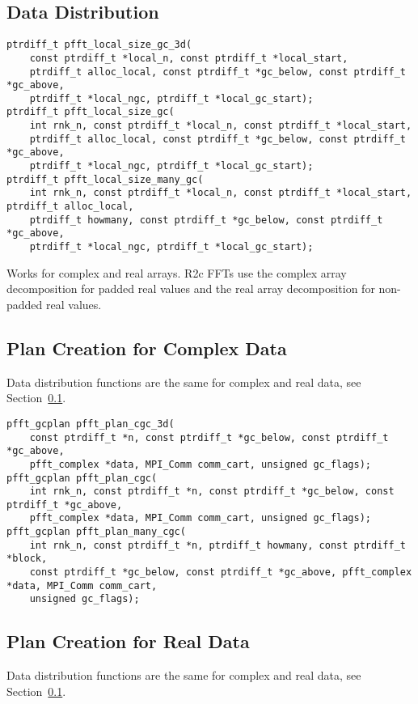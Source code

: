 \subsection{Data Distribution}\label{sec:gc:local_size}
\begin{lstlisting}
ptrdiff_t pfft_local_size_gc_3d(
    const ptrdiff_t *local_n, const ptrdiff_t *local_start,
    ptrdiff_t alloc_local, const ptrdiff_t *gc_below, const ptrdiff_t *gc_above,
    ptrdiff_t *local_ngc, ptrdiff_t *local_gc_start);
ptrdiff_t pfft_local_size_gc(
    int rnk_n, const ptrdiff_t *local_n, const ptrdiff_t *local_start,
    ptrdiff_t alloc_local, const ptrdiff_t *gc_below, const ptrdiff_t *gc_above,
    ptrdiff_t *local_ngc, ptrdiff_t *local_gc_start);
ptrdiff_t pfft_local_size_many_gc(
    int rnk_n, const ptrdiff_t *local_n, const ptrdiff_t *local_start, ptrdiff_t alloc_local,
    ptrdiff_t howmany, const ptrdiff_t *gc_below, const ptrdiff_t *gc_above,
    ptrdiff_t *local_ngc, ptrdiff_t *local_gc_start);
\end{lstlisting}
Works for complex and real arrays. R2c FFTs use the complex array decomposition for padded real values and the real array decomposition for non-padded real values.

\subsection{Plan Creation for Complex Data}
Data distribution functions are the same for complex and real data, see Section~\ref{sec:gc:local_size}.

\begin{lstlisting}
pfft_gcplan pfft_plan_cgc_3d(
    const ptrdiff_t *n, const ptrdiff_t *gc_below, const ptrdiff_t *gc_above,
    pfft_complex *data, MPI_Comm comm_cart, unsigned gc_flags);
pfft_gcplan pfft_plan_cgc(
    int rnk_n, const ptrdiff_t *n, const ptrdiff_t *gc_below, const ptrdiff_t *gc_above,
    pfft_complex *data, MPI_Comm comm_cart, unsigned gc_flags);
pfft_gcplan pfft_plan_many_cgc(
    int rnk_n, const ptrdiff_t *n, ptrdiff_t howmany, const ptrdiff_t *block,
    const ptrdiff_t *gc_below, const ptrdiff_t *gc_above, pfft_complex *data, MPI_Comm comm_cart,
    unsigned gc_flags);
\end{lstlisting}


\subsection{Plan Creation for Real Data}
Data distribution functions are the same for complex and real data, see Section~\ref{sec:gc:local_size}.

